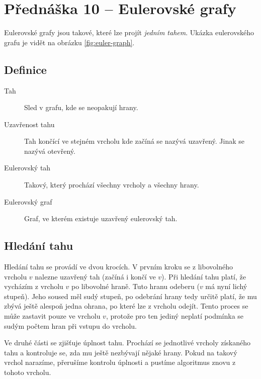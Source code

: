 \section{Přednáška 10 -- Eulerovské grafy}

Eulerovské grafy jsou takové, které lze projít \textit{jedním tahem}.
Ukázka eulerovského grafu je vidět na obrázku \ref{fig:euler-graph}.


\subsection{Definice}

\begin{description}
    \item[Tah] Sled v grafu, kde se neopakují hrany.
    \item[Uzavřenost tahu] Tah končící ve stejném vrcholu kde začíná se nazývá uzavřený.
    Jinak se nazývá otevřený.
    \item[Eulerovský tah] Takový, který prochází všechny vrcholy a všechny hrany.
    \item[Eulerovský graf] Graf, ve kterém existuje uzavřený eulerovský tah.
\end{description}


\subsection{Hledání tahu}\label{alg:euleruv-tah}

Hledání tahu se provádí ve dvou krocích.
V prvním kroku se z libovolného vrcholu $v$ nalezne uzavřený tah (začíná i končí ve $v$).
Při hledání tahu platí, že vycházím z vrcholu $v$ po libovolné hraně.
Tuto hranu odeberu ($v$ má nyní lichý stupeň).
Jeho soused měl sudý stupeň, po odebrání hrany tedy určitě platí, že mu zbývá ještě alespoň jedna ohrana, po které lze z vrcholu odejít.
Tento proces se může zastavit pouze ve vrcholu $v$, protože pro ten jediný neplatí podmínka se sudým počtem hran při vstupu do vrcholu.

Ve druhé části se zjišťuje úplnost tahu.
Prochází se jednotlivé vrcholy získaného tahu a kontroluje se, zda mu ještě nezbývají nějaké hrany.
Pokud na takový vrchol narazíme, přerušíme kontrolu úplnosti a pustíme algoritmus znovu z tohoto vrcholu.

